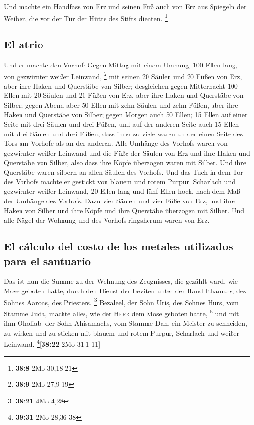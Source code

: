  Und machte ein Handfass von Erz und seinen Fuß auch von
Erz aus Spiegeln der Weiber, die vor der Tür der Hütte des Stifts
dienten. \footnote{\textbf{38:8} 2Mo 30,18-21}

\hypertarget{el-atrio}{%
\subsection{El atrio}\label{el-atrio}}

 Und er machte den Vorhof: Gegen Mittag mit einem Umhang,
100 Ellen lang, von gezwirnter weißer Leinwand, \footnote{\textbf{38:9}
  2Mo 27,9-19}  mit seinen 20 Säulen und 20 Füßen von
Erz, aber ihre Haken und Querstäbe von Silber; 
desgleichen gegen Mitternacht 100 Ellen mit 20 Säulen und 20 Füßen von
Erz, aber ihre Haken und Querstäbe von Silber;  gegen
Abend aber 50 Ellen mit zehn Säulen und zehn Füßen, aber ihre Haken und
Querstäbe von Silber;  gegen Morgen auch 50 Ellen;
 15 Ellen auf einer Seite mit drei Säulen und drei Füßen,
 und auf der anderen Seite auch 15 Ellen mit drei Säulen
und drei Füßen, dass ihrer so viele waren an der einen Seite des Tors am
Vorhofe als an der anderen.  Alle Umhänge des Vorhofs
waren von gezwirnter weißer Leinwand  und die Füße der
Säulen von Erz und ihre Haken und Querstäbe von Silber, also dass ihre
Köpfe überzogen waren mit Silber. Und ihre Querstäbe waren silbern an
allen Säulen des Vorhofs.  Und das Tuch in dem Tor des
Vorhofs machte er gestickt von blauem und rotem Purpur, Scharlach und
gezwirnter weißer Leinwand, 20 Ellen lang und fünf Ellen hoch, nach dem
Maß der Umhänge des Vorhofs.  Dazu vier Säulen und vier
Füße von Erz, und ihre Haken von Silber und ihre Köpfe und ihre
Querstäbe überzogen mit Silber.  Und alle Nägel der
Wohnung und des Vorhofs ringsherum waren von Erz.

\hypertarget{el-cuxe1lculo-del-costo-de-los-metales-utilizados-para-el-santuario}{%
\subsection{El cálculo del costo de los metales utilizados para el
santuario}\label{el-cuxe1lculo-del-costo-de-los-metales-utilizados-para-el-santuario}}

 Das ist nun die Summe zu der Wohnung des Zeugnisses, die
gezählt ward, wie Mose geboten hatte, durch den Dienst der Leviten unter
der Hand Ithamars, des Sohnes Aarons, des Priesters. \footnote{\textbf{38:21}
  4Mo 4,28}  Bezaleel, der Sohn Uris, des Sohnes Hurs,
vom Stamme Juda, machte alles, wie der \textsc{Herr} dem Mose geboten
hatte, \textsuperscript{b}  und mit ihm Oholiab, der Sohn
Ahisamachs, vom Stamme Dan, ein Meister zu schneiden, zu wirken und zu
sticken mit blauem und rotem Purpur, Scharlach und weißer Leinwand.
\footnote{\textbf{39:31} 2Mo 28,36-38}{[}\textbf{38:22} 2Mo 31,1-11{]}

